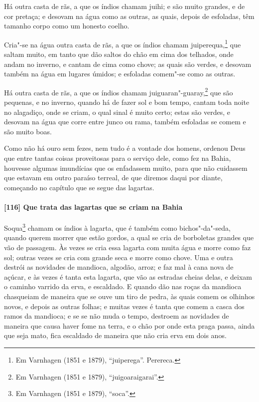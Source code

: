 Há outra casta de rãs, a que os índios chamam juihi; e são muito grandes, e de cor
pretaça; e desovam na água como as outras, as quais, depois de esfoladas, têm tamanho
corpo como um honesto coelho.

Cria"-se na água outra casta de rãs, a que os índios chamam juiperequa,\footnote{ Em
Varnhagen (1851 e 1879), ``juiperega''. Perereca.} que saltam muito, em tanto que dão
saltos do chão em cima dos telhados, onde andam no inverno, e cantam de cima como chove;
as quais são verdes, e desovam também na água em lugares úmidos; e esfoladas comem"-se como
as outras.

Há outra casta de rãs, a que os índios chamam juiguaran"-guaray,\footnote{ Em Varnhagen
(1851 e 1879), ``juigoaraigarai''.} que são pequenas, e no inverno, quando há de fazer
sol e bom tempo, cantam toda noite no alagadiço, onde se criam, o qual sinal é muito
certo; estas são verdes, e desovam na água que corre entre junco ou rama, também esfoladas
se comem e são muito boas.

Como não há ouro sem fezes, nem tudo é a vontade dos homens, ordenou Deus que entre tantas
coisas proveitosas para o serviço dele, como fez na Bahia, houvesse algumas imundícias que
os enfadassem muito, para que não cuidassem que estavam em outro paraíso terreal, de que
diremos daqui por diante, começando no capítulo que se segue das lagartas.

\paragraph{[116] Que trata das lagartas que se criam na Bahia}\quad
Soqua\footnote{ Em Varnhagen (1851 e 1879), ``soca''.} chamam os índios à lagarta, que é
também como bichos"-da"-seda, quando querem morrer que estão gordos, a qual se cria de
borboletas grandes que vão de passagem. Às vezes se cria essa lagarta com muita água e
morre como faz sol; outras vezes se cria com grande seca e morre como chove. Uma e outra
destrói as novidades de mandioca, algodão, arroz; e faz mal à cana nova de açúcar, e às
vezes é tanta esta lagarta, que vão as estradas cheias delas, e deixam o caminho varrido
da erva, e escaldado. E quando dão nas roças da mandioca chasqueiam de maneira que se ouve
um tiro de pedra, às quais comem os olhinhos novos, e depois as outras folhas; e muitas
vezes é tanta que comem a casca dos ramos da mandioca; e se se não muda o tempo, destroem
as novidades de maneira que causa haver fome na terra, e o chão por onde esta praga passa,
ainda que seja mato, fica escaldado de maneira que não cria erva em dois anos.

